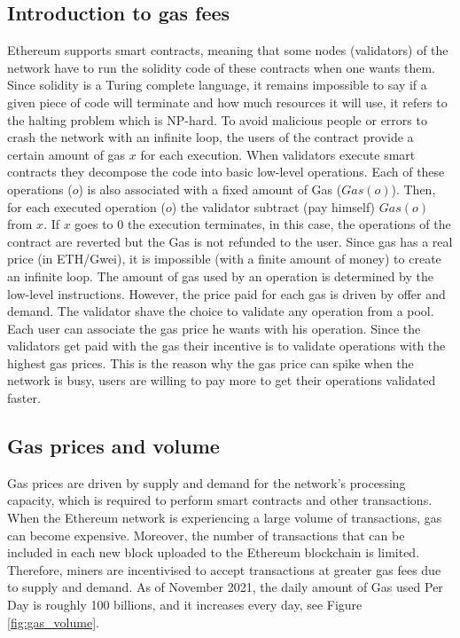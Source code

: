 \subsection{Introduction to gas fees}
Ethereum\cite{EthereumWhitepaper}  supports  smart  contracts,  meaning  that  some  nodes (validators) of the network have to run the solidity code of these contracts when one wants them. Since  solidity  is  a  Turing  complete  language,  it  remains impossible to say if a given piece of code will terminate and how much resources it will use, it refers to the halting problem which is NP-hard. To avoid malicious people or errors to crash the  network  with  an  infinite  loop,  the  users  of  the  contract provide  a  certain  amount  of  gas $x$ for  each  execution.  When validators  execute  smart  contracts  they  decompose  the  code into basic low-level operations. Each of these operations ($o$) is also associated with a fixed amount of Gas ($Gas(o)$). Then, for each executed operation ($o$) the validator subtract (pay himself) $Gas(o)$ from $x$.  If  $x$  goes  to  $0$  the  execution  terminates,  in this  case,  the  operations  of  the  contract  are  reverted  but  the Gas is not refunded to the user. Since gas has a real price (in ETH/Gwei), it is impossible (with a finite amount of money) to create an infinite loop. The amount of gas used by an operation is determined by the low-level instructions. However, the price paid for each gas is driven by offer and demand. The validator shave  the  choice  to  validate  any  operation  from  a  pool.  Each user  can  associate the  gas  price  he  wants with  his  operation. Since  the  validators  get  paid  with  the  gas  their  incentive  is to validate operations with the highest gas prices. This is the reason why the gas price can spike when the network is busy, users are willing to pay more to get their operations validated faster.
\subsection{Gas prices and volume}
Gas prices are driven by supply and demand for the network's processing capacity, which is required to perform smart contracts and other transactions.
When the Ethereum network is experiencing a large volume of transactions, gas can become expensive. Moreover, the number of transactions that can be included in each new block uploaded to the Ethereum blockchain is limited. Therefore, miners are incentivised to accept transactions at greater gas fees due to supply and demand. As of November 2021, the daily amount of Gas used Per Day is roughly 100 billions, and it increases every day, see Figure \ref{fig:gas_volume}. 

